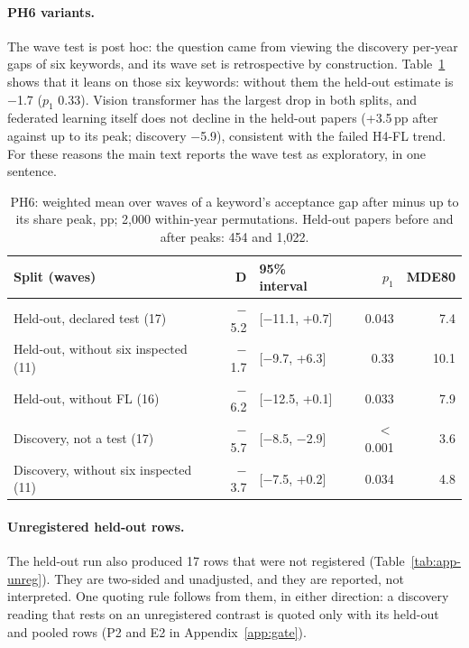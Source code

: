 \paragraph{PH6 variants.} The wave test is post hoc: the question came from viewing the discovery per-year gaps of six
keywords, and its wave set is retrospective by construction. Table~\ref{tab:app-ph6} shows that it leans on those six
keywords: without them the held-out estimate is $-$1.7 ($p_1$ 0.33). Vision transformer has the largest drop in both
splits, and federated learning itself does not decline in the held-out papers (+3.5\,pp after against up to its peak;
discovery $-$5.9), consistent with the failed H4-FL trend. For these reasons the main text reports the wave test as
exploratory, in one sentence.

\begin{table}[t]
\centering\footnotesize
\setlength{\tabcolsep}{3pt}
\begin{tabular}{@{}>{\raggedright\arraybackslash}p{2.45cm}rlrr@{}}
\toprule
Split (waves) & D & 95\% interval & $p_1$ & MDE80 \\
\midrule
Held-out, declared test (17) & $-$5.2 & [$-$11.1, +0.7] & 0.043 & 7.4 \\
Held-out, without six inspected (11) & $-$1.7 & [$-$9.7, +6.3] & 0.33 & 10.1 \\
Held-out, without FL (16) & $-$6.2 & [$-$12.5, +0.1] & 0.033 & 7.9 \\
Discovery, not a test (17) & $-$5.7 & [$-$8.5, $-$2.9] & $<$0.001 & 3.6 \\
Discovery, without six inspected (11) & $-$3.7 & [$-$7.5, +0.2] & 0.034 & 4.8 \\
\bottomrule
\end{tabular}
\caption{PH6: weighted mean over waves of a keyword's acceptance gap after minus up to its share peak, pp; 2,000
within-year permutations. Held-out papers before and after peaks: 454 and 1,022.}
\label{tab:app-ph6}
\end{table}

\paragraph{Unregistered held-out rows.} The held-out run also produced 17 rows that were not registered
(Table~\ref{tab:app-unreg}). They are two-sided and unadjusted, and they are reported, not interpreted. One quoting
rule follows from them, in either direction: a discovery reading that rests on an unregistered contrast is quoted only
with its held-out and pooled rows (P2 and E2 in Appendix~\ref{app:gate}).

